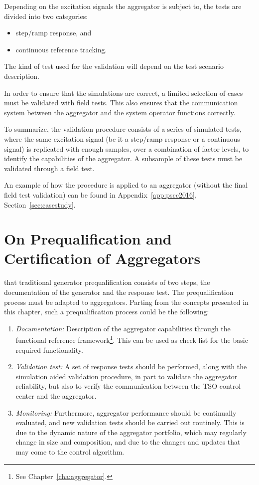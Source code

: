 Depending on the excitation signals the aggregator is subject to, the tests are divided into two categories:
\begin{itemize}
	\item step/ramp response, and
	\item continuous reference tracking.
\end{itemize}
The kind of test used for the validation will depend on the test scenario description.

In order to ensure that the simulations are correct, a limited selection of cases must be validated with field tests. This also ensures that the communication system between the aggregator and the system operator functions correctly.

To summarize, the validation procedure consists of a series of simulated tests, where the same excitation signal (be it a step/ramp response or a continuous signal) is replicated with enough samples, over a combination of factor levels, to identify the capabilities of the aggregator. A subsample of these tests must be validated through a field test.

An example of how the procedure is applied to an aggregator (without the final field test validation) can be found in Appendix~\ref{app:pscc2016}, Section~\ref{sec:casestudy}.

\section{On Prequalification and Certification of Aggregators}\label{sec:aggpreq}
 that traditional generator prequalification consists of two steps, the documentation of the generator and the response test. The prequalification process must be adapted to aggregators. Parting from the concepts presented in this chapter, such a prequalification process could be the following:
\begin{enumerate}
	\item \emph{Documentation:} Description of the aggregator capabilities through the functional reference framework\footnote{See Chapter~\ref{cha:aggregator}.}. This can be used as check list for the basic required functionality.
	\item \emph{Validation test:} A set of response tests should be performed, along with the simulation aided validation procedure, in part to validate the aggregator reliability, but also to verify the communication between the TSO control center and the aggregator.
	\item \emph{Monitoring:} Furthermore, aggregator performance should be continually evaluated, and new validation tests should be carried out routinely. This is due to the dynamic nature of the aggregator portfolio, which may regularly change in size and composition, and due to the changes and updates that may come to the control algorithm.
\end{enumerate}

